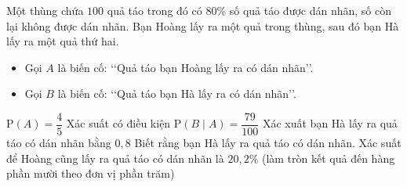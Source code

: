 \begin{ex}%
	Một thùng chứa $100$ quả táo trong đó có $80\%$ số quả táo được dán nhãn, số còn lại không được dán nhãn. Bạn Hoàng lấy ra một quả trong thùng, sau đó bạn Hà lấy ra một quả thứ hai.
	\begin{itemize}
		\item Gọi $A$ là biến cố: \lq\lq Quả táo bạn Hoàng lấy ra có dán nhãn\rq\rq.
		\item Gọi $B$ là biến cố: \lq\lq Quả táo bạn Hà lấy ra có dán nhãn\rq\rq.
	\end{itemize}
	\choiceTF
	{\True $\mathrm{P}(A)=\dfrac{4}{5}$}
	{Xác suất có điều kiện $\mathrm{P}(B\mid A)=\dfrac{79}{100}$}
	{\True Xác xuất bạn Hà lấy ra quả táo có dán nhãn bằng $0{,}8$}
	{Biết rằng bạn Hà lấy ra quả táo có dán nhãn. Xác suất để Hoàng cũng lấy ra quả táo có dán nhãn là $20{,}2\%$ (làm tròn kết quả đến hàng phần mười theo đơn vị phần trăm)}
\end{ex}

